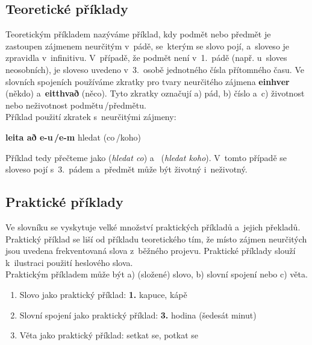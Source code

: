 \subsection*{Teoretické příklady}

Teoretickým příkladem nazýváme příklad, kdy podmět nebo předmět je zastoupen zájmenem neurčitým v~pádě, se~kterým se slovo pojí, a~sloveso je zpravidla v~infinitivu. V~případě, že podmět není v~1.~pádě (např. u~sloves neosobních), je sloveso uvedeno v~3.~osobě jednotného čísla přítomného času.
Ve slovních spojeních používáme zkratky pro tvary neurčitého zájmena \textbf{einhver} (někdo) a~\textbf{eitthvað} (něco). Tyto zkratky označují a) pád, b) číslo a~c) životnost nebo neživotnost podmětu\,/\addthin předmětu.\\
Příklad použití zkratek s~neurčitými zájmeny:

\blspace
  \dicEntry {}   \textbf{leita að e-u\,/\addthin e-m} {hledat (co\,/\addthin koho)}  
\blspace

Příklad tedy přečteme jako  (\textit{hledat co}) a~ (\textit{hledat koho}). V~tomto případě se sloveso pojí s~3.~pádem a~předmět může být životný i~neživotný.

\subsection*{Praktické příklady}

Ve slovníku se vyskytuje velké množství praktických příkladů a~jejich překladů. Praktický příklad se liší od příkladu teoretického tím, že místo zájmen neurčitých jsou uvedena frekventovaná slova z~běžného projevu. Praktické příklady slouží k~ilustraci použití
heslového slova.\\
Praktickým příkladem může být a) (složené) slovo, b) slovní spojení nebo c) věta.

\begin{enumerate}
\item Slovo jako praktický příklad:
\blspace
\dicEntry {}   \textbf{1.} {kapuce, kápě}  
\blspace
\item Slovní spojení jako praktický příklad:
\blspace
\dicEntry {}   \textbf{3.}  {hodina} {\footnotesize{(šedesát minut)}}  
\blspace
\item Věta jako praktický příklad:
\blspace
\dicEntry {}       {setkat se, potkat se}  
\end{enumerate}

